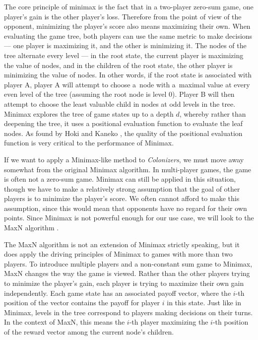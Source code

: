 The core principle of minimax is the fact that in a two-player zero-sum game,
one player's gain is the other player's loss. Therefore from the point of view
of the opponent, minimizing the player's score also means maximizing their own.
When evaluating the game tree, both players can use the same metric to make decisions
--- one player is maximizing it, and the other is minimizing it.
The nodes of the tree alternate every level --- in the root state, the current player
is maximizing the value of nodes, and in the children of the root state, the other
player is minimizing the value of nodes. In other words, if the root state is associated
with player A, player A will attempt to choose a~node with a~maximal value at every
even level of the tree (assuming the root node is level 0). Player B will then attempt
to choose the least valuable child in nodes at odd levels in the tree.
Minimax explores the tree of game states up to a depth $d$, whereby rather than
deepening the tree, it uses a positional evaluation function to evaluate the leaf nodes.
As found by Hoki and Kaneko \cite{Hoki14}, the quality of the positional evaluation
function is very critical to the performance of Minimax.

If we want to apply a Minimax-like method to \emph{Colonizers}, we must move away
somewhat from the original Minimax algorithm. In multi-player games, the game
is often not a zero-sum game. Minimax can still be applied in this situation, though
we have to make a relatively strong assumption that the goal of other players
is to minimize the player's score. We often cannot afford to make this assumption,
since this would mean that opponents have no regard for their own points.
Since Minimax is not powerful enough for our use case, we will look
to the MaxN algorithm \cite{Luckhardt86}.

The MaxN algorithm is not an extension of Minimax strictly speaking, but it does
apply the driving principles of Minimax to games with more than two players.
To introduce multiple players and a non-constant sum game to Minimax, MaxN
changes the way the game is viewed. Rather than the other players trying to minimize
the player's gain, each player is trying to maximize their own gain independently.
Each game state has an associated payoff vector, where the $i$-th position of the vector
contains the payoff for player $i$ in this state. Just like in Minimax, levels
in the tree correspond to players making decisions on their turns. In the context
of MaxN, this means the $i$-th player maximizing the $i$-th position of the reward vector
among the current node's children.

